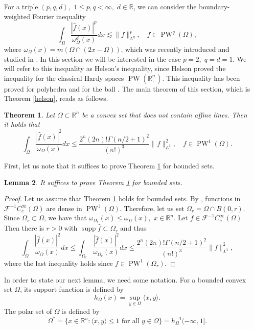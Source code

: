 \documentclass{amsart}
\theoremstyle{plain}
\newtheorem{theo}{Theorem}[section]
\newtheorem{lm}[theo]{Lemma}
\DeclareMathOperator{\PW}{PW}
\DeclareMathOperator{\supp}{supp}
\begin{document}
For a triple $(p,q,d),$ $1\leq p,q<\infty,$ $d\in\mathbb{R}$, we can consider the boundary-weighted Fourier inequality
$$\int_\Omega \dfrac{|\hat{f}(x)|^p}{\omega_\Omega^d(x)}dx\lesssim \|f\|_{L^q}^p,\quad f\in \PW^q(\Omega),$$ where $\omega_\Omega(x)=m(\Omega\cap (2x-\Omega))$, which was recently introduced and studied in \cite{bampouras2026boundaryweightedfourierinequalitiesconvex}. In this section we will be interested in the case $p=2,$ $q=d=1.$ We will refer to this inequality as Helson's inequality, since Helson proved the inequality for the classical Hardy spaces $\PW(\mathbb{R}^n_+)$.
This inequality has been proved for polyhedra \cite[Theorem 4.5]{bampouras2026boundaryweightedfourierinequalitiesconvex} and for the ball \cite[Theorem 5.3]{bampouras2026boundaryweightedfourierinequalitiesconvex}. The main theorem of this section, which is Theorem \ref{helson}, reads as follows.
\begin{theo}\label{helson1}
	Let $\Omega\subset \mathbb{R}^n$ be a convex set that does not contain affine lines. Then it holds that $$\int_{\Omega}\dfrac{|\hat{f}(x)|^2}{\omega_\Omega(x)}dx\leq \frac{2^n(2n)!\Gamma(n/2+1)^2}{(n!)^3}\|f\|_{L^1}^2, \quad f\in\PW^1(\Omega).$$
\end{theo}
First, let us note that it suffices to prove Theorem \ref{helson1} for bounded sets.
\begin{lm}\label{unbounded}
	It suffices to prove Theorem \ref{helson1} for bounded sets.
\end{lm}
\begin{proof}
	Let us assume that Theorem \ref{helson1} holds for bounded sets. By \cite[Lemma 2.6]{bampouras2026boundaryweightedfourierinequalitiesconvex}, functions in $\mathcal{F}^{-1}C_c^\infty(\Omega)$ are dense in $\PW^1(\Omega)$. Therefore, let us set $\Omega_r=\Omega\cap B(0,r)$. Since $\Omega_r\subset \Omega$, we have that $\omega_{\Omega_r}(x)\leq \omega_\Omega(x),$ $x\in\mathbb{R}^n$. Let $f\in \mathcal{F}^{-1}C_c^\infty(\Omega)$. Then there is $r>0$ with $\supp\hat{f}\subset \Omega_r$ and thus
	$$\int_\Omega \dfrac{|\hat{f}(x)|^2}{\omega_\Omega(x)}dx\leq\int_{\Omega_r} \dfrac{|\hat{f}(x)|^2}{\omega_{\Omega_r}(x)}dx\leq \frac{2^n(2n)!\Gamma(n/2+1)^2}{(n!)^3}\|f\|_{L^1}^2,$$ where the last inequality holds since $f\in \PW^1(\Omega_r)$.
\end{proof}
In order to state our next lemma, we need some notation. For a bounded convex set $\Omega$, its support function is defined by $$h_\Omega(x)=\sup_{y\in \Omega} \langle x,y\rangle.$$ The polar set of $\Omega$ is defined by
$$\Omega^\ast =\{x\in\mathbb{R}^n:\langle x,y\rangle\leq 1\text{ for all } y\in\Omega\}=h_\Omega^{-1}(-\infty,1].$$
\end{document}
